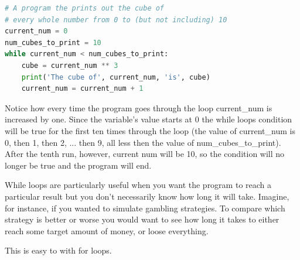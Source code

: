 \documentclass[]{article}
\begin{document}
\begin{lstlisting}[language=python]
# A program the prints out the cube of
# every whole number from 0 to (but not including) 10
current_num = 0
num_cubes_to_print = 10
while current_num < num_cubes_to_print:
    cube = current_num ** 3
    print('The cube of', current_num, 'is', cube)
    current_num = current_num + 1

\end{lstlisting}

Notice how every time the program goes through the loop current\_num is increased by one.  Since the variable's value starts at 0 the while loops condition will be true for the first ten times through the loop (the value of current\_num is 0, then 1, then 2, ... then 9, all less then the value of num\_cubes\_to\_print). After the tenth run, however, current num will be 10, so the condition will no longer be true and the program will end.

While loops are particularly useful when you want the program to reach a particular result but you don't necessarily know how long it will take.  Imagine, for instance, if you wanted to simulate gambling strategies. To compare which strategy is better or worse you would want to see how long it takes to either reach some target amount of money, or loose everything.

This is easy to with for loops.
\end{document}
